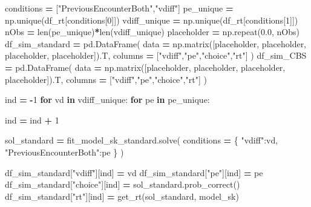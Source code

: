 \documentclass[
]{book}
\newenvironment{Shaded}{\begin{snugshade}}{\end{snugshade}}
\newcommand{\BuiltInTok}[1]{#1}
\newcommand{\ControlFlowTok}[1]{\textcolor[rgb]{0.13,0.29,0.53}{\textbf{#1}}}
\newcommand{\DecValTok}[1]{\textcolor[rgb]{0.00,0.00,0.81}{#1}}
\newcommand{\FloatTok}[1]{\textcolor[rgb]{0.00,0.00,0.81}{#1}}
\newcommand{\KeywordTok}[1]{\textcolor[rgb]{0.13,0.29,0.53}{\textbf{#1}}}
\newcommand{\NormalTok}[1]{#1}
\newcommand{\OperatorTok}[1]{\textcolor[rgb]{0.81,0.36,0.00}{\textbf{#1}}}
\newcommand{\StringTok}[1]{\textcolor[rgb]{0.31,0.60,0.02}{#1}}
\begin{document}
\begin{Shaded}
\begin{Highlighting}[]
\NormalTok{conditions }\OperatorTok{=}\NormalTok{ [}\StringTok{"PreviousEncounterBoth"}\NormalTok{,}\StringTok{"vdiff"}\NormalTok{]}
\NormalTok{pe\_unique }\OperatorTok{=}\NormalTok{ np.unique(df\_rt[conditions[}\DecValTok{0}\NormalTok{]])}
\NormalTok{vdiff\_unique }\OperatorTok{=}\NormalTok{ np.unique(df\_rt[conditions[}\DecValTok{1}\NormalTok{]])}
\NormalTok{nObs }\OperatorTok{=} \BuiltInTok{len}\NormalTok{(pe\_unique)}\OperatorTok{*}\BuiltInTok{len}\NormalTok{(vdiff\_unique)}
\NormalTok{placeholder }\OperatorTok{=}\NormalTok{ np.repeat(}\FloatTok{0.0}\NormalTok{, nObs)}
\NormalTok{df\_sim\_standard }\OperatorTok{=}\NormalTok{ pd.DataFrame(}
\NormalTok{  data }\OperatorTok{=}\NormalTok{ np.matrix([placeholder, placeholder, placeholder, placeholder]).T,}
\NormalTok{  columns }\OperatorTok{=}\NormalTok{ [}\StringTok{"vdiff"}\NormalTok{,}\StringTok{"pe"}\NormalTok{,}\StringTok{"choice"}\NormalTok{,}\StringTok{"rt"}\NormalTok{]}
\NormalTok{)}
\NormalTok{df\_sim\_CBS }\OperatorTok{=}\NormalTok{ pd.DataFrame(}
\NormalTok{  data }\OperatorTok{=}\NormalTok{ np.matrix([placeholder, placeholder, placeholder, placeholder]).T,}
\NormalTok{  columns }\OperatorTok{=}\NormalTok{ [}\StringTok{"vdiff"}\NormalTok{,}\StringTok{"pe"}\NormalTok{,}\StringTok{"choice"}\NormalTok{,}\StringTok{"rt"}\NormalTok{]}
\NormalTok{)}

\NormalTok{ind }\OperatorTok{=} \OperatorTok{{-}}\DecValTok{1}
\ControlFlowTok{for}\NormalTok{ vd }\KeywordTok{in}\NormalTok{ vdiff\_unique:}
  \ControlFlowTok{for}\NormalTok{ pe }\KeywordTok{in}\NormalTok{ pe\_unique:}
      
\NormalTok{      ind }\OperatorTok{=}\NormalTok{ ind }\OperatorTok{+} \DecValTok{1}
      
\NormalTok{      sol\_standard }\OperatorTok{=}\NormalTok{ fit\_model\_sk\_standard.solve(}
\NormalTok{        conditions }\OperatorTok{=}\NormalTok{ \{}
          \StringTok{"vdiff"}\NormalTok{:vd,}
          \StringTok{"PreviousEncounterBoth"}\NormalTok{:pe}
\NormalTok{        \}}
\NormalTok{      )}
      
\NormalTok{      df\_sim\_standard[}\StringTok{"vdiff"}\NormalTok{][ind] }\OperatorTok{=}\NormalTok{ vd}
\NormalTok{      df\_sim\_standard[}\StringTok{"pe"}\NormalTok{][ind] }\OperatorTok{=}\NormalTok{ pe}
\NormalTok{      df\_sim\_standard[}\StringTok{"choice"}\NormalTok{][ind] }\OperatorTok{=}\NormalTok{ sol\_standard.prob\_correct()}
\NormalTok{      df\_sim\_standard[}\StringTok{"rt"}\NormalTok{][ind] }\OperatorTok{=}\NormalTok{ get\_rt(sol\_standard, model\_sk)}
      

\end{Highlighting}
\end{Shaded}
\end{document}
